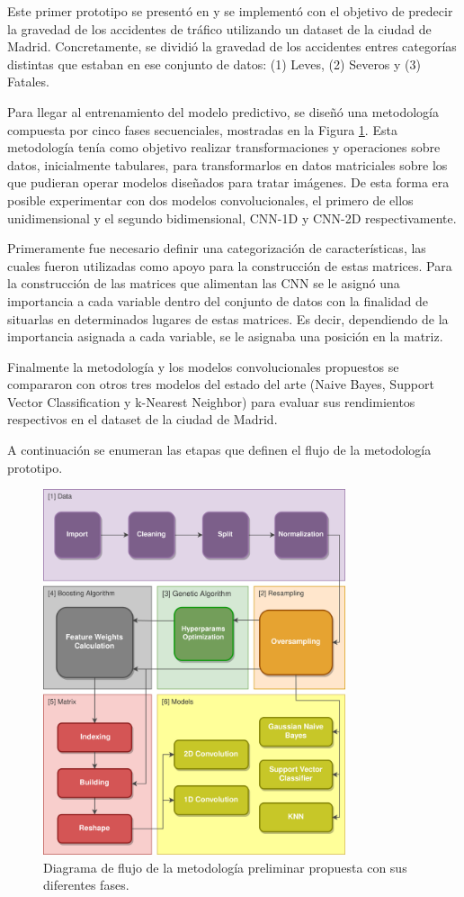 \documentclass{uathesis-es}
\begin{document}
Este primer prototipo se presentó en \cite{PEREZSALA2023113245} y se implementó con el objetivo de predecir la gravedad de los accidentes de tráfico utilizando un dataset de la ciudad de Madrid. Concretamente, se dividió la gravedad de los accidentes entres categorías distintas que estaban en ese conjunto de datos: (1) Leves, (2) Severos y (3) Fatales.

Para llegar al entrenamiento del modelo predictivo, se diseñó una metodología compuesta por cinco fases secuenciales, mostradas en la Figura \ref{figDegree}. Esta metodología tenía como objetivo realizar transformaciones y operaciones sobre datos, inicialmente tabulares, para transformarlos en datos matriciales sobre los que pudieran operar modelos diseñados para tratar imágenes. De esta forma era posible experimentar con dos modelos convolucionales, el primero de ellos unidimensional y el segundo bidimensional, CNN-1D y CNN-2D respectivamente.

Primeramente fue necesario definir una categorización de características, las cuales fueron utilizadas como apoyo para la construcción de estas matrices. Para la construcción de las matrices que alimentan las CNN se le asignó una importancia a cada variable dentro del conjunto de datos con la finalidad de situarlas en determinados lugares de estas matrices. Es decir, dependiendo de la importancia asignada a cada variable, se le asignaba una posición en la matriz. 

Finalmente la metodología y los modelos convolucionales propuestos se compararon con otros tres modelos del estado del arte (Naive Bayes, Support Vector Classification y k-Nearest Neighbor) para evaluar sus rendimientos respectivos en el dataset de la ciudad de Madrid.

A continuación se enumeran las etapas que definen el flujo de la metodología prototipo.

\begin{figure}[H]
    \centering
    \includegraphics[width=3.5in]{Figures/1stPaper/Data_flow.png}
    \caption{Diagrama de flujo de la metodología preliminar propuesta con sus diferentes fases.}
    \label{figDegree}
\end{figure}
\end{document}
